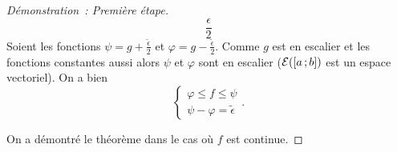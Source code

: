 \begin{proof}[Démonstration~: Première étape]
\begin{equation}
    \frac{\epsilon}{2}
  \end{equation}
  Soient les fonctions \(\psi=g + \frac{\tilde{\epsilon}}{2}\) et \(\varphi=g -
  \frac{\tilde{\epsilon}}{2}\). Comme \(g\) est en escalier et les fonctions
  constantes aussi alors \(\psi\) et \(\varphi\) sont en escalier
  (\(\mathcal{E}(\left[ a \, ; {} b \right])\) est un espace vectoriel). On a bien
  \begin{equation}
    \begin{cases}
      \varphi \leqslant f \leqslant \psi \\
      \psi-\varphi=\tilde{\epsilon}
    \end{cases}.
  \end{equation}

  On a démontré le théorème dans le cas où \(f\) est continue.
\end{proof}
